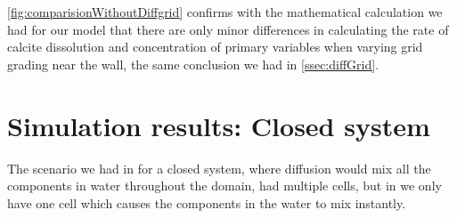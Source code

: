 \cref{fig:comparisionWithoutDiffgrid} confirms with the mathematical calculation we had for our model that there are only minor differences 
in calculating the rate of calcite dissolution and concentration of primary variables when varying grid grading near the wall, 
the same conclusion we had in \cref{ssec:diffGrid}. 


\section{\MATLAB Simulation results: Closed system}
The scenario we had in \DuMuX for a closed system, where diffusion would mix all the components in water throughout the domain, 
had multiple cells, but in \MATLAB we only have one cell which causes the components in the water to mix instantly. \\

